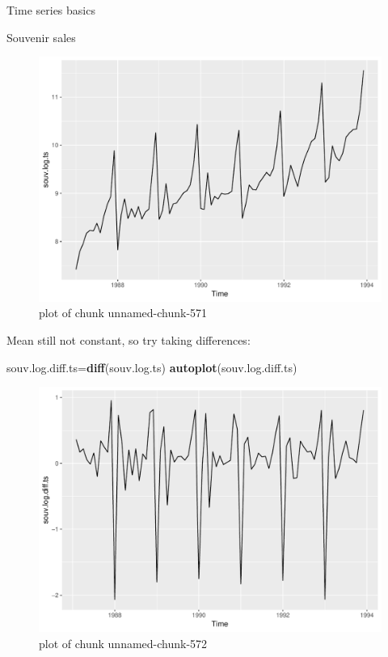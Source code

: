 \documentclass[ignorenonframetext,]{beamer}
\newenvironment{Shaded}{\begin{snugshade}}{\end{snugshade}}
\newcommand{\KeywordTok}[1]{\textcolor[rgb]{0.13,0.29,0.53}{\textbf{#1}}}
\newcommand{\NormalTok}[1]{#1}
\begin{document}
\begin{frame}[fragile]{Time series basics}
\begin{block}{Souvenir sales}
\begin{figure}
\centering
\includegraphics{figure/unnamed-chunk-571-1.pdf}
\caption{plot of chunk unnamed-chunk-571}
\end{figure}

Mean still not constant, so try taking differences:

\begin{Shaded}
\begin{Highlighting}[]
\NormalTok{souv.log.diff.ts=}\KeywordTok{diff}\NormalTok{(souv.log.ts)}
\KeywordTok{autoplot}\NormalTok{(souv.log.diff.ts)}
\end{Highlighting}
\end{Shaded}

\begin{figure}
\centering
\includegraphics{figure/unnamed-chunk-572-1.pdf}
\caption{plot of chunk unnamed-chunk-572}
\end{figure}


\end{block}
\end{frame}
\end{document}
